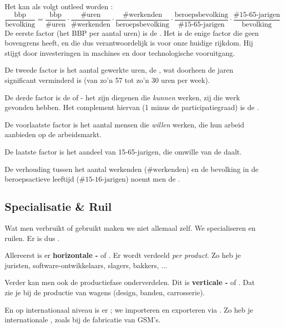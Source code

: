 Het  kan als volgt ontleed worden :
$$\frac{\text{bbp}}{\text{bevolking}}=\frac{\text{bbp}}{\text{\#uren}}\cdot\frac{\text{\#uren}}{\text{\#werkenden}}\cdot\frac{\text{\#werkenden}}{\text{beroepsbevolking}}\cdot\frac{\text{beroepsbevolking}}{\text{\#15-65-jarigen}}\cdot\frac{\text{\#15-65-jarigen}}{\text{bevolking}}$$
De eerste factor (het BBP per aantal uren) is de . Het is de enige factor die geen bovengrens heeft, en die dus verantwoordelijk is voor onze huidige rijkdom. Hij stijgt door investeringen in machines en door technologische vooruitgang.
\par\noindent De tweede factor is het aantal gewerkte uren, de , wat doorheen de jaren significant verminderd is (van zo'n 57 tot zo'n 30 uren per week).
\par\noindent De derde factor is de  of  - het zijn diegenen die \textit{kunnen} werken, zij die werk gevonden hebben. Het complement hiervan (1 minus de participatiegraad) is de . 
\par\noindent De voorlaatste factor is het aantal mensen die \textit{willen} werken, die hun arbeid aanbieden op de arbeidsmarkt. 
\par\noindent De laatste factor is het aandeel van 15-65-jarigen, die omwille van de  daalt. 
\par\noindent De verhouding tussen het aantal werkenden ($\text{\#werkenden}$) en de bevolking in de beroepsactieve leeftijd ($\text{\#15-16-jarigen}$) noemt men de .

\subsection{Specialisatie \& Ruil}

Wat men verbruikt of gebruikt maken we niet allemaal zelf. We specialiseren en ruilen. Er is dus .
\par\noindent Allereerst is er \textbf{horizontale -} of . Er wordt verdeeld \textit{per product}. Zo heb je juristen, software-ontwikkelaars, slagers, bakkers, ... 
\par\noindent Verder kan men ook de productiefase onderverdelen. Dit is \textbf{verticale -} of . Dat zie je bij de productie van wagens (design, banden, carrosserie).
\par En op internationaal niveau is er  ; we importeren en exporteren via . Zo heb je internationale , zoals bij de fabricatie van GSM's.\\

